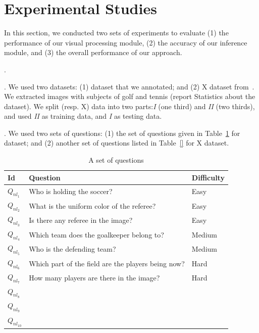 \section{Experimental Studies}
\label{sec-expt}

In this section, we conducted two sets of experiments to evaluate (1) the performance of our visual processing module, (2) the accuracy of our inference module, and (3) the overall performance of our approach. 

. %

. We used two datasets: (1)  dataset that we annotated; and (2) X dataset from~\cite{}. We extracted images with subjects of golf and tennis (report Statistics about the dataset). We split  (resp. X) data into two parts:{\em  I} (one third) and {\em II} (two thirds), and used {\em II} as training data, and {\em I} as testing data. 

. We used two sets of questions: (1) the set of questions given in Table~\ref{table:questions} for  dataset; and (2) another set of questions listed in Table~\ref{} for X dataset. 

\begin{table}[thb] 
\footnotesize
\begin{tabular}{|l|l|l|}
\hline
Id & Question                                           & Difficulty \\ \hline
$Q_{nl_1}$  & Who is holding the soccer?                         & Easy       \\ \hline
$Q_{nl_2}$  & What is the uniform color of the referee?           & Easy       \\ \hline
$Q_{nl_3}$  & Is there any referee in the image?                 & Easy       \\ \hline
$Q_{nl_4}$  & Which team does the goalkeeper belong to?          & Medium       \\ \hline
$Q_{nl_5}$  & Who is the defending team?                         & Medium       \\ \hline
$Q_{nl_6}$  & Which part of the field are the players being now? & Hard       \\ \hline
$Q_{nl_7}$  & How many players are there in the image?           & Hard     \\ \hline
$Q_{nl_8}$  &            &      \\ \hline
$Q_{nl_9}$  &            &      \\ \hline
$Q_{nl_10}$  &            &      \\ \hline
\end{tabular} 
\caption{A set of questions} \label{table:questions}
\end{table}




